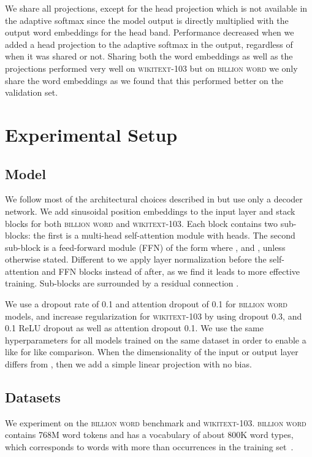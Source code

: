\documentclass{article} \usepackage{iclr2019_conference,times}
\def\gbw{\textsc{billion word}}
\def\wiki{\textsc{wikitext-103}}
\begin{document}
We share all projections, except for the head projection which is not available in the adaptive softmax since the model output is directly multiplied with the output word embeddings for the head band.
Performance decreased when we added a head projection to the adaptive softmax in the output, regardless of when it was shared or not.
Sharing both the word embeddings as well as the projections performed very well on \wiki{} but on \gbw{} we only share the word embeddings as we found that this performed better on the validation set.
 
\section{Experimental Setup}
\subsection{Model}\label{sec:model}

We follow most of the architectural choices described in \citet{vaswani2017transformer} but use only a decoder network.
We add sinusoidal position embeddings to the input layer and stack  blocks for both \gbw{} and \wiki{}.
Each block contains two sub-blocks: the first is a multi-head self-attention module with  heads.
The second sub-block is a feed-forward module (FFN) of the form  where ,  and ,  unless otherwise stated.
Different to \citet{vaswani2017transformer} we apply layer normalization before the self-attention and FFN blocks instead of after, as we find it leads to more effective training. 
Sub-blocks are surrounded by a residual connection \citep{he2015deep}.


We use a dropout rate of 0.1 and attention dropout of 0.1 for \gbw{} models, and increase regularization for \wiki{} by using dropout 0.3, and 0.1 ReLU dropout as well as attention dropout 0.1.
We use the same hyperparameters for all models trained on the same dataset in order to enable a like for like comparison. 
When the dimensionality of the input or output layer differs from , then we add a simple linear projection with no bias.


\subsection{Datasets}\label{sec:datasets}

We experiment on the \gbw{} benchmark and \wiki{}. 
\gbw{} contains 768M word tokens and has a vocabulary of about 800K word types, which corresponds to words with more than  occurrences in the training set~\citep{chelba:2013:techreport}. 
\end{document}
